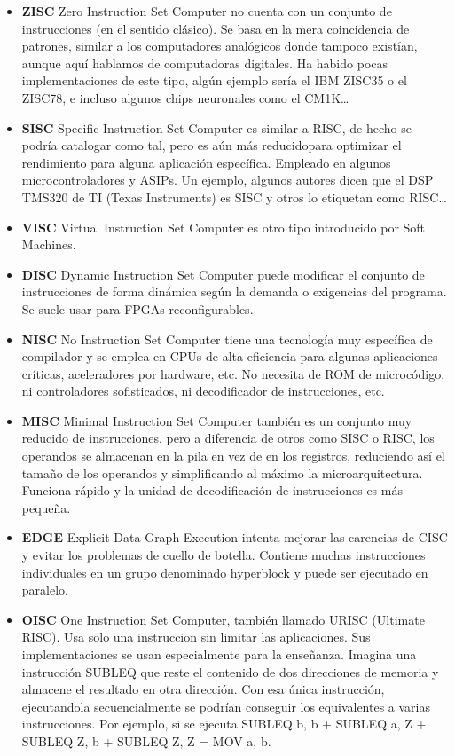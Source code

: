 \documentclass[a4paper, 11pt, titlepage]{article}
\begin{document}
        \begin{itemize}
            \item \textbf{ZISC} Zero Instruction Set Computer no cuenta con un conjunto de instrucciones (en el sentido 
            clásico). Se basa en la mera coincidencia de patrones, similar a los computadores analógicos donde tampoco 
            existían, aunque aquí hablamos de computadoras digitales. Ha habido pocas implementaciones de este tipo, algún 
            ejemplo sería el IBM ZISC35 o el ZISC78, e incluso algunos chips neuronales como el CM1K…
            \item \textbf{SISC} Specific Instruction Set Computer es similar a RISC, de hecho se podría catalogar como tal, 
            pero es aún más reducidopara optimizar el rendimiento para alguna aplicación específica. Empleado en algunos 
            microcontroladores y ASIPs. Un ejemplo, algunos autores dicen que el DSP TMS320 de TI (Texas Instruments) es 
            SISC y otros lo etiquetan como RISC…
            \item \textbf{VISC} Virtual Instruction Set Computer es otro tipo introducido por Soft Machines.
            \item \textbf{DISC} Dynamic Instruction Set Computer puede modificar el conjunto de instrucciones de forma dinámica 
            según la demanda o exigencias del programa. Se suele usar para FPGAs reconfigurables.
            \item \textbf{NISC} No Instruction Set Computer tiene una tecnología muy específica de compilador y se emplea en 
            CPUs de alta eficiencia para algunas aplicaciones críticas, aceleradores por hardware, etc. No necesita de ROM de 
            microcódigo, ni controladores sofisticados, ni decodificador de instrucciones, etc.
            \item \textbf{MISC} Minimal Instruction Set Computer también es un conjunto muy reducido de instrucciones, pero a
            diferencia de otros como SISC o RISC, los operandos se almacenan en la pila en vez de en los registros, reduciendo 
            así el tamaño de los operandos y simplificando al máximo la microarquitectura. Funciona rápido y la unidad de 
            decodificación de instrucciones es más pequeña.
            \item \textbf{EDGE} Explicit Data Graph Execution intenta mejorar las carencias de CISC y evitar los problemas de 
            cuello de botella. Contiene muchas instrucciones individuales en un grupo denominado hyperblock y puede ser 
            ejecutado en paralelo.
            \item \textbf{OISC} One Instruction Set Computer, también llamado URISC (Ultimate RISC). Usa solo una instruccion 
            sin limitar las aplicaciones. Sus implementaciones se usan especialmente para la enseñanza. Imagina una instrucción 
            SUBLEQ que reste el contenido de dos direcciones de memoria y almacene el resultado en otra dirección. Con esa única 
            instrucción, ejecutandola secuencialmente se podrían conseguir los equivalentes a varias instrucciones. Por ejemplo, 
            si se ejecuta SUBLEQ b, b + SUBLEQ a, Z + SUBLEQ Z, b + SUBLEQ Z, Z = MOV a, b.            
        \end{itemize}
\end{document}
